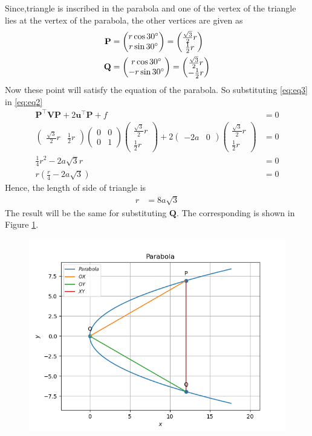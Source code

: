 \documentclass[12pt]{article}
\providecommand{\brak}[1]{\ensuremath{\left(#1\right)}}
\newcommand{\myvec}[1]{\ensuremath{\begin{pmatrix}#1\end{pmatrix}}}
\let\vec\mathbf
\begin{document}
Since,triangle is inscribed in the parabola and one of the vertex of the triangle lies at the vertex of the parabola, the other vertices are given as
\begin{align}
	\label{eq:eq3}
	\vec{P} &= \myvec{r\cos 30\degree\\r\sin 30\degree} = \myvec{\frac{\sqrt{3}}{2}r\\\frac{1}{2}r}\\
	\vec{Q} &= \myvec{r\cos 30\degree\\-r\sin 30\degree} = \myvec{\frac{\sqrt{3}}{2}r\\-\frac{1}{2}r}
\end{align}
Now these point will satisfy the equation of the parabola. So substituting \eqref{eq:eq3} in \eqref{eq:eq2}
\begin{align}
	\vec{P}^\top \vec{V}\vec{P}+2\vec{u}^\top \vec{P}+f&=0\\
	\myvec{\frac{\sqrt{3}}{2}r&\frac{1}{2}r}\myvec{0&0\\0&1}\myvec{\frac{\sqrt{3}}{2}r\\\frac{1}{2}r}+2\myvec{-2a&0}\myvec{\frac{\sqrt{3}}{2}r\\\frac{1}{2}r} &= 0\\
	\frac{1}{4}r^2 - 2a\sqrt{3}r &= 0\\
	r\brak{\frac{r}{4} - 2a\sqrt{3}} &= 0
\end{align}
Hence, the length of side of triangle is
\begin{align}
	r &= 8a\sqrt{3}
\end{align}
The result will be the same for substituting $\vec{Q}$. The corresponding is shown in Figure \ref{fig:Fig1}.
\begin{figure}[!h]
	\begin{center} 
	    \includegraphics[width=\columnwidth]{figs/conic5}
	\end{center}
\caption{}
\label{fig:Fig1}
\end{figure}
\end{document}
